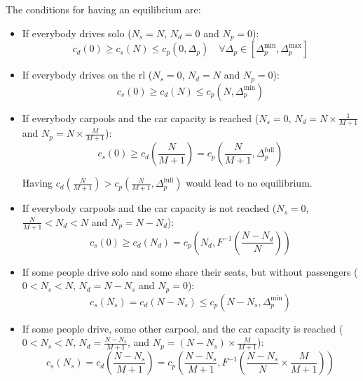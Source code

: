 \documentclass[english, a4paper]{article}
\theoremstyle{plain}
\theoremstyle{definition}
\theoremstyle{remark}
\begin{document}
The conditions for having an equilibrium are:
\begin{itemize}
    \item If everybody drives solo ($N_s = N$, $N_d = 0$ and $N_p = 0$):
        \begin{equation}
            \label{eq_equilibrium_cond_start}
            c_d(0) \geq c_s(N) \leq c_p(0, \Delta _p)\quad \forall \Delta_p\in [\Delta_p^{\text{min}}, \Delta_p^{\text{max}}]
        \end{equation}
    
    \item If everybody drives on the \acrshort{rl} ($N_s = 0$, $N_d = N$ and $N_p = 0$):
        \begin{equation}
            c_s(0) \geq c_d (N) \leq c_p(N, \Delta _p^{\text{min}})
        \end{equation}

    \item If everybody carpools and the car capacity is reached ($N_s = 0$, $N_d = N\times \frac{1}{M+1}$ and $N_p = N\times \frac{M}{M+1}$):
        \begin{equation}
            \label{eq_equilibrium_Ns0_Nd_carfull}
            c_s(0) \geq c_d \left(\frac{N}{M+1}\right) = c_p\left(\frac{N}{M+1}, \Delta _p^{\text{full}}\right)
        \end{equation}

        Having $c_d \left(\frac{N}{M+1}\right) > c_p\left(\frac{N}{M+1}, \Delta _p^{\text{full}}\right)$ would lead to no equilibrium.

        
    \item If everybody carpools and the car capacity is not reached ($N_s = 0$, $\frac{N}{M+1} < N_d < N$ and $N_p = N - N_d$):
        \begin{equation}
            c_s(0) \geq c_d (N_d) = c_p\left(N_d, F^{-1} \left( \frac{N - N_d}{N} \right)\right)
        \end{equation}

    \item If some people drive solo and some share their seats, but without passengers ($0 < N_s < N$, $N_d = N - N_s$ and $N_p = 0$):
        \begin{equation}
            c_s(N_s) = c_d (N - N_s) \leq c_p(N - N_s, \Delta _p^{\text{min}})
        \end{equation}

    \item If some people drive, some other carpool, and the car capacity is reached ($0 < N_s < N$, $N_d = \frac{N-N_s}{M+1}$, and $N_p = (N-N_s)\times \frac{M}{M+1}$):
        \begin{equation}
        \label{eq_equilibrium_Ns_Nd_carfull}
            c_s(N_s) =  c_d \left( \frac{N-N_s}{M+1} \right) = c_p \left( \frac{N-N_s}{M+1}, F^{-1} \left( \frac{N-N_s}{N}\times \frac{M}{M+1} \right) \right)
        \end{equation}


\end{itemize}
\end{document}
